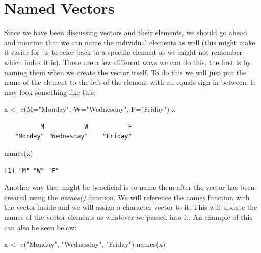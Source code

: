 \documentclass[
  letterpaper,
  DIV=11,
  numbers=noendperiod]{scrreprt}
\newenvironment{Shaded}{\begin{snugshade}}{\end{snugshade}}
\newcommand{\AttributeTok}[1]{\textcolor[rgb]{0.40,0.45,0.13}{#1}}
\newcommand{\FunctionTok}[1]{\textcolor[rgb]{0.28,0.35,0.67}{#1}}
\newcommand{\NormalTok}[1]{\textcolor[rgb]{0.00,0.23,0.31}{#1}}
\newcommand{\OtherTok}[1]{\textcolor[rgb]{0.00,0.23,0.31}{#1}}
\newcommand{\StringTok}[1]{\textcolor[rgb]{0.13,0.47,0.30}{#1}}
\begin{document}
\section{Named Vectors}\label{named-vectors}

Since we have been discussing vectors and their elements, we should go
ahead and mention that we can name the individual elements as well (this
might make it easier for us to refer back to a specific element as we
might not remember which index it is). There are a few different ways we
can do this, the first is by naming them when we create the vector
itself. To do this we will just put the name of the element to the left
of the element with an equals sign in between. It may look something
like this:

\begin{Shaded}
\begin{Highlighting}[]
\NormalTok{x }\OtherTok{\textless{}{-}} \FunctionTok{c}\NormalTok{(}\AttributeTok{M=}\StringTok{"Monday"}\NormalTok{, }\AttributeTok{W=}\StringTok{"Wednesday"}\NormalTok{, }\AttributeTok{F=}\StringTok{"Friday"}\NormalTok{)}
\NormalTok{x}
\end{Highlighting}
\end{Shaded}

\begin{verbatim}
          M           W           F 
   "Monday" "Wednesday"    "Friday" 
\end{verbatim}

\begin{Shaded}
\begin{Highlighting}[]
\FunctionTok{names}\NormalTok{(x)}
\end{Highlighting}
\end{Shaded}

\begin{verbatim}
[1] "M" "W" "F"
\end{verbatim}

Another way that might be beneficial is to name them after the vector
has been created using the \emph{names()} function. We will reference
the names function with the vector inside and we will assign a character
vector to it. This will update the names of the vector elements as
whatever we passed into it. An example of this can also be seen below:

\begin{Shaded}
\begin{Highlighting}[]
\NormalTok{x }\OtherTok{\textless{}{-}} \FunctionTok{c}\NormalTok{(}\StringTok{"Monday"}\NormalTok{, }\StringTok{"Wednesday"}\NormalTok{, }\StringTok{"Friday"}\NormalTok{)}
\FunctionTok{names}\NormalTok{(x)}
\end{Highlighting}
\end{Shaded}
\end{document}
